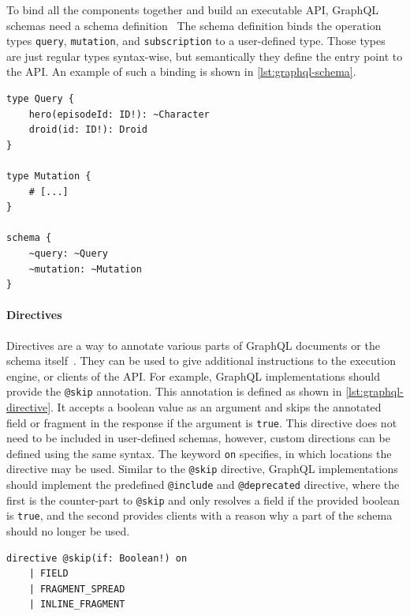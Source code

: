 To bind all the components together and build an executable \ac{API}, GraphQL schemas need a schema definition~\cite{Facebook2018}
The schema definition binds the operation types \texttt{query}, \texttt{mutation}, and \texttt{subscription} to a user-defined type.
Those types are just regular types syntax-wise, but semantically they define the entry point to the \ac{API}.
An example of such a binding is shown in \autoref{lst:graphql-schema}.

\begin{lstlisting}[caption={Query and Mutation Types}, language=graphqls, label={lst:graphql-schema}]
type Query {
    hero(episodeId: ID!): ~Character
    droid(id: ID!): Droid
}

type Mutation { 
    # [...]
}

schema {
    ~query: ~Query
    ~mutation: ~Mutation
}      
\end{lstlisting}

\paragraph{Directives}

Directives are a way to annotate various parts of GraphQL documents or the schema itself~\cite{Facebook2018}.
They can be used to give additional instructions to the execution engine, or clients of the \ac{API}.
For example, GraphQL implementations should provide the \texttt{@skip} annotation.
This annotation is defined as shown in \autoref{lst:graphql-directive}.
It accepts a boolean value as an argument and skips the annotated field or fragment in the response if the argument is \texttt{true}.
This directive does not need to be included in user-defined schemas, however, custom directions can be defined using the same syntax.
The keyword \texttt{on} specifies, in which locations the directive may be used.
Similar to the \texttt{@skip} directive, GraphQL implementations should implement the predefined \texttt{@include} and \texttt{@deprecated} directive, where the first is the counter-part to \texttt{@skip} and only resolves a field if the provided boolean is \texttt{true}, and the second provides clients with a reason why a part of the schema should no longer be used.


\begin{lstlisting}[caption={Definition of the \texttt{@skip} Annotation}, language=graphqls, label={lst:graphql-directive}]
directive @skip(if: Boolean!) on
    | FIELD 
    | FRAGMENT_SPREAD 
    | INLINE_FRAGMENT
\end{lstlisting}

